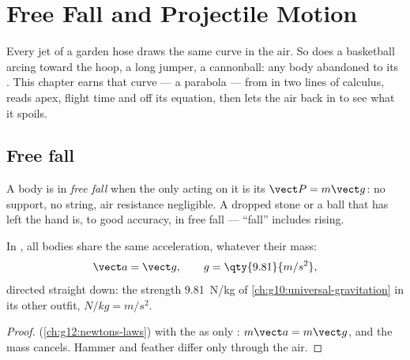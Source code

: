 \chapter{Free Fall and Projectile Motion}\label{ch:g12:projectile-motion}

Every jet of a garden hose draws the same curve in the air. So does a
basketball arcing toward the hoop, a long jumper, a cannonball: any body
abandoned to its . This chapter earns that curve --- a parabola ---
from  in two lines of calculus, reads apex, flight
time and  off its equation, then lets the air back in to see what
it spoils.

\section{Free fall}

\begin{definition}\label{def:g12:projectile-motion:freefall}
A body is in \emph{free fall} when the only  acting on
it is its  $\vect P = m\vect g$: no support, no string, air resistance
negligible. A dropped stone or a ball that has left the hand is, to good
accuracy, in free fall --- ``fall'' includes rising.
\end{definition}

\begin{theorem}\label{thm:g12:projectile-motion:galileo}
In , all bodies share the same acceleration, whatever their mass:
\[
\vect a = \vect g, \qquad g = \qty{9.81}{m/s^2},
\]
directed straight down: the  strength \qty{9.81}{N/kg} of
\cref{ch:g10:universal-gravitation} in its other outfit, $\unit{N/kg} = \unit{m/s^2}$.
\end{theorem}

\begin{proof}
 (\cref{ch:g12:newtons-laws}) with the  as only
: $m\vect a = m\vect g$, and the mass cancels. Hammer and feather
differ only through the air.
\end{proof}

